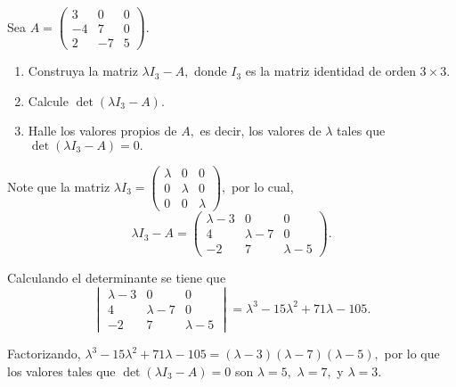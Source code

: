 \begin{prob} Sea $A=\left(
\begin{matrix}
3&0&0\\
-4&7&0\\
2&-7&5
\end{matrix} 
\right).$
\begin{enumerate}[$(a)$]
\item Construya la matriz $\lambda I_{3} - A,$ donde $I_{3}$ es la matriz identidad de orden $3\times 3$.

\item Calcule $\det(\lambda I_{3}-A).$

\item Halle los valores propios de $A,$ es decir, los valores de $\lambda$ tales que $\det(\lambda I_{3}-A)=0.$  
\end{enumerate}

\begin{myproof} 
Note que la matriz $\lambda I_{3}=\begin{pmatrix} \lambda &0&0\\0&\lambda &0\\ 0&0&\lambda \end{pmatrix},$ por lo cual, 
$$\lambda I_{3}-A=\begin{pmatrix} \lambda-3&0&0\\4&\lambda -7&0\\-2&7&\lambda-5 \end{pmatrix}.$$ 

Calculando el determinante se tiene que 
\[ \begin{vmatrix}
\lambda-3 & 0 & 0 \\
4 & \lambda-7 & 0 \\
-2 & 7 & \lambda-5
\end{vmatrix}=\lambda^3-15\lambda^2+71\lambda-105. \]

Factorizando, $\lambda^3-15\lambda^2+71\lambda-105=\left(\lambda -3\right)\left( \lambda -7 \right)\left( \lambda -5 \right),$ por lo que los valores tales que $\det(\lambda I_{3}-A)=0$ son $\lambda=5,$ $\lambda=7,$ y $\lambda=3.$

\end{myproof}
\end{prob}


